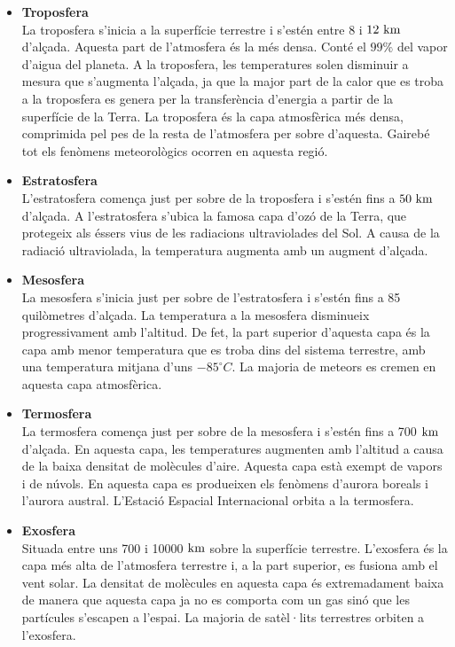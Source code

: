 \begin{itemize}
    \item \textbf{Troposfera} \\
    La troposfera s’inicia a la superfície terrestre i s’estén entre 8 i $12 \ \kilo\meter$ d’alçada. Aquesta part de l’atmosfera és la més densa. Conté el $99\%$ del vapor d'aigua del planeta. A la troposfera, les temperatures solen disminuir a mesura que s'augmenta l'alçada, ja que la major part de la calor que es troba a la troposfera es genera per la transferència d’energia a partir de la superfície de la Terra. La troposfera és la capa atmosfèrica més densa, comprimida pel pes de la resta de l’atmosfera per sobre d’aquesta. Gairebé tot els fenòmens meteorològics ocorren en aquesta regió.

    \item \textbf{Estratosfera} \\
    L’estratosfera comença just per sobre de la troposfera i s’estén fins a $50 \ \kilo\meter$ d’alçada. A l'estratosfera s'ubica la famosa capa d'ozó de la Terra, que protegeix als éssers vius de les radiacions ultraviolades del Sol. A causa de la radiació ultraviolada, la temperatura augmenta amb un augment d'alçada.

    \item \textbf{Mesosfera} \\
    La mesosfera s’inicia just per sobre de l’estratosfera i s’estén fins a 85 quilòmetres d’alçada. La temperatura a la mesosfera disminueix progressivament amb l’altitud. De fet, la part superior d’aquesta capa és la capa amb menor temperatura que es troba dins del sistema terrestre, amb una temperatura mitjana d’uns $-85^\circ C$. La majoria de meteors es cremen en aquesta capa atmosfèrica.

    \item \textbf{Termosfera} \\
    La termosfera comença just per sobre de la mesosfera i s’estén fins a 700 $\kilo\meter$ d’alçada. En aquesta capa, les temperatures augmenten amb l'altitud a causa de la baixa densitat de molècules d'aire. Aquesta capa està exempt de vapors i de núvols. En aquesta capa es produeixen els fenòmens d'aurora boreals i l'aurora austral. L’Estació Espacial Internacional orbita a la termosfera.

    \item \textbf{Exosfera} \\
    Situada entre uns 700 i 10000 $\kilo\meter$ sobre la superfície terrestre. L'exosfera és la capa més alta de l'atmosfera terrestre i, a la part superior, es fusiona amb el vent solar. La densitat de molècules en aquesta capa és extremadament baixa de manera que aquesta capa ja no es comporta com un gas sinó que les partícules s’escapen a l’espai. La majoria de satèl·lits terrestres orbiten a l’exosfera.
\end{itemize}

